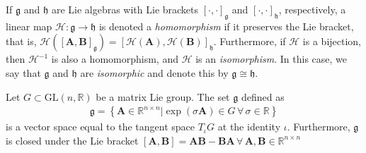 \begin{definition}
    If $\mathfrak{g}$ and $\mathfrak{h}$ are Lie algebras with Lie brackets $[\cdot, \cdot]_\mathfrak{g}$ and $[\cdot, \cdot]_\mathfrak{h}$, respectively, a linear map $\mathcal{H}:\mathfrak{g}\to\mathfrak{h}$ is denoted a \emph{homomorphism} if it preserves the Lie bracket, that is, $\mathcal{H}([\mathbf{A}, \mathbf{B}]_\mathfrak{g}) = [\mathcal{H}(\mathbf{A}), \mathcal{H}(\mathbf{B})]_\mathfrak{h}$. Furthermore, if $\mathcal{H}$ is a bijection, then $\mathcal{H}^{-1}$ is also a homomorphism, and $\mathcal{H}$ is an \emph{isomorphism}. In this case, we say that $\mathfrak{g}$ and $\mathfrak{h}$ are \emph{isomorphic} and denote this by $\mathfrak{g}\cong\mathfrak{h}$.
\end{definition}

\begin{theorem}
    Let $G\subset\text{GL}(n, \mathbb{R})$ be a matrix Lie group. The set $\mathfrak{g}$ defined as
    \begin{align}
        \mathfrak{g} = \left\{\mathbf{A}\in\mathbb{R}^{n\times n} | \exp(\sigma\mathbf{A})\in G\,\forall\,\sigma\in\mathbb{R}\right\}
    \end{align}
    is a vector space equal to the tangent space $T_\iota G$ at the identity $\iota$. Furthermore, $\mathfrak{g}$ is closed under the Lie bracket $[\mathbf{A}, \mathbf{B}] = \mathbf{A}\mathbf{B} - \mathbf{B}\mathbf{A}\,\forall\,\mathbf{A},\mathbf{B}\in\mathbb{R}^{n\times n}$
\end{theorem}

